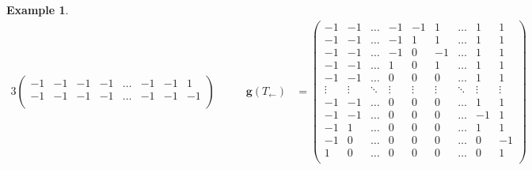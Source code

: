 \documentclass{amsart}
\theoremstyle{definition}
\newtheorem{example}[theorem]{Example}
\renewcommand{\b}[1]{{\boldsymbol{#1}}} %
\begin{document}
\begin{example}
\begin{table}
\begin{alignat*}{3}
\begin{pmatrix}
		-1 & -1 & -1 & -1 & \dots & -1 & -1 & 1 \\
		-1 & -1 & -1 & -1 & \dots & -1 & -1 & -1 \\
	\end{pmatrix}
	\qquad &
	\b{g}(T_\leftarrow) & = \begin{pmatrix}
		-1 & -1 & \dots & -1 & -1 & 1 & \dots & 1 & 1 \\
		-1 & -1 & \dots & -1 & 1 & 1 & \dots & 1 & 1 \\
		-1 & -1 & \dots & -1 & 0 & -1 & \dots & 1 & 1 \\
		-1 & -1 & \dots & 1 & 0 & 1 & \dots & 1 & 1 \\
		-1 & -1 & \dots & 0 & 0 & 0 & \dots & 1 & 1 \\
		\vdots & \vdots & \ddots & \vdots & \vdots & \vdots & \ddots & \vdots & \vdots \\
		-1 & -1 & \dots & 0 & 0 & 0 & \dots & 1 & 1 \\
		-1 & -1 & \dots & 0 & 0 & 0 & \dots & -1 & 1 \\
		-1 & 1 & \dots & 0 & 0 & 0 & \dots & 1 & 1 \\
		-1 & 0 & \dots & 0 & 0 & 0 & \dots & 0 & -1 \\
		1 & 0 & \dots & 0 & 0 & 0 & \dots & 0 & 1 \\
	\end{pmatrix}

\end{alignat*}
\end{table}
\end{example}
\end{document}
